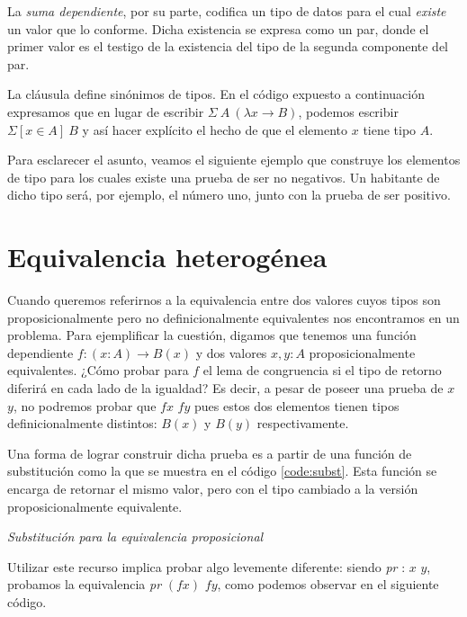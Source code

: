 La {\it suma dependiente}, por su parte, codifica un tipo de datos para el cual {\it existe} un valor que lo conforme. Dicha existencia se expresa como un par, donde el primer valor es el testigo de la existencia del tipo de la segunda componente del par. 

La cláusula  define sinónimos de tipos. En el código expuesto a continuación expresamos que en lugar de escribir $\Sigma\ A\ (\lambda x \to B)$, podemos escribir $\Sigma [ x \in A]\ B$ y así hacer explícito el hecho de que el elemento $x$ tiene tipo $A$. 


Para esclarecer el asunto, veamos el siguiente ejemplo que construye los elementos de tipo \AgdaDatatype{$\Nat$} para los cuales existe una prueba de ser no negativos. Un habitante de dicho tipo será, por ejemplo, el número uno, junto con la prueba de ser positivo.
  

\section{Equivalencia heterogénea}

Cuando queremos referirnos a la equivalencia entre dos valores cuyos tipos son proposicionalmente pero no definicionalmente equivalentes nos encontramos en un problema. 
Para ejemplificar la cuestión, digamos que tenemos una función dependiente $f : (x : A) \to B(x)$ y dos valores $x, y : A$ proposicionalmente equivalentes. ¿Cómo probar para $f$ el lema de congruencia si el tipo de retorno diferirá en cada lado de la igualdad? 
Es decir, a pesar de poseer una prueba de $x$ \AgdaDatatype{$\equiv$} $y$, no podremos probar que $f x$ \AgdaDatatype{$\equiv$} $f y$ pues estos dos elementos tienen tipos definicionalmente distintos: $B(x)$ y $B(y)$ respectivamente.

Una forma de lograr construir dicha prueba es a partir de una función de substitución como la que se muestra en el código \ref{code:subst}.
Esta función se encarga de retornar el mismo valor, pero con el tipo cambiado a la versión proposicionalmente equivalente.

\begin{agdacode}{\it Substitución para la equivalencia proposicional}\label{code:subst}

\end{agdacode}
Utilizar este recurso implica probar algo levemente diferente: siendo {\it pr} : $x$ \AgdaDatatype{$\equiv$} $y$, probamos la equivalencia  {\it pr} $(f x)$ \AgdaDatatype{$\equiv$} $f y$, como podemos observar en el siguiente código.

